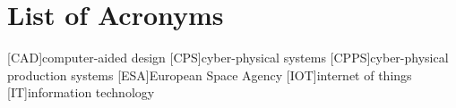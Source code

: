 \chapter*{List of Acronyms}
\begin{acronym}
    [CAD]{computer-aided design}
    [CPS]{cyber-physical systems}
    [CPPS]{cyber-physical production systems}
    [ESA]{European Space Agency}
    [IOT]{internet of things}
    [IT]{information technology}
\end{acronym}
